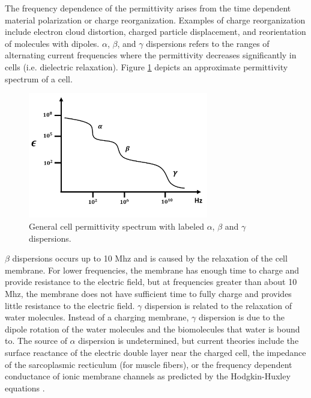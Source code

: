  \par The frequency dependence of the permittivity arises from the time dependent material polarization or charge reorganization. Examples of charge reorganization include electron cloud distortion, charged particle displacement, and reorientation of molecules with dipoles. $\alpha$, $\beta$, and $\gamma$ dispersions refers to the ranges of alternating current frequencies where the permittivity decreases significantly in cells (i.e. dielectric relaxation). Figure \ref{fig:schwan_dispersions} depicts an approximate permittivity spectrum of a cell.
 
 \begin{figure}[ht]
 \centering
 \includegraphics[width=0.7\textwidth]{images/schwanDispersions.png}
 \caption[General cell permittivity spectrum]{General cell permittivity spectrum with labeled $\alpha$, $\beta$ and $\gamma$ dispersions.}
 \label{fig:schwan_dispersions}
 \end{figure}
 
 \par $\beta$ dispersions occurs up to 10 Mhz and is caused by the relaxation of the cell membrane. For lower frequencies, the membrane has enough time to charge and provide resistance to the electric field, but at frequencies greater than about 10 Mhz, the membrane does not have sufficient time to fully charge and provides little resistance to the electric field. $\gamma$ dispersion is related to the relaxation of water molecules. Instead of a charging membrane, $\gamma$ dispersion is due to the dipole rotation of the water molecules and the biomolecules that water is bound to. The source of $\alpha$ dispersion is undetermined, but current theories include the surface reactance of the electric double layer near the charged cell, the impedance of the sarcoplasmic recticulum (for muscle fibers), or the frequency dependent conductance of ionic membrane channels as predicted by the Hodgkin-Huxley equations \cite{schwan_electrical_1994}.
 
